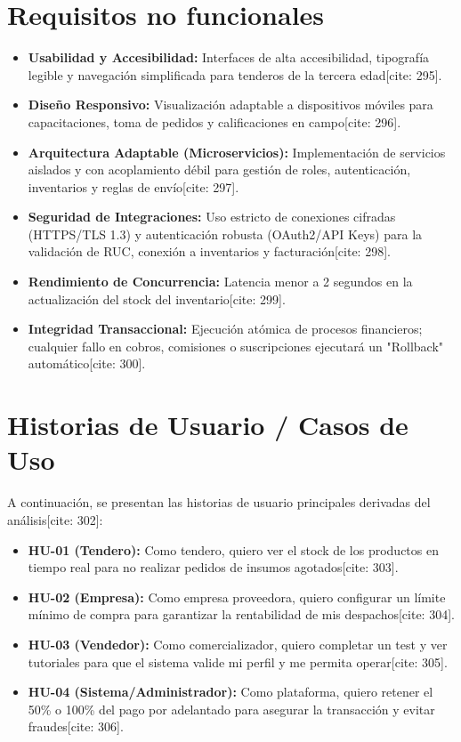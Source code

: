 \documentclass[11pt,a4paper]{report}
\begin{document}
\section{Requisitos no funcionales} %
\begin{itemize}[leftmargin=*]
    \item \textbf{Usabilidad y Accesibilidad:} Interfaces de alta accesibilidad, tipografía legible y navegación simplificada para tenderos de la tercera edad[cite: 295].
    \item \textbf{Diseño Responsivo:} Visualización adaptable a dispositivos móviles para capacitaciones, toma de pedidos y calificaciones en campo[cite: 296].
    \item \textbf{Arquitectura Adaptable (Microservicios):} Implementación de servicios aislados y con acoplamiento débil para gestión de roles, autenticación, inventarios y reglas de envío[cite: 297].
    \item \textbf{Seguridad de Integraciones:} Uso estricto de conexiones cifradas (HTTPS/TLS 1.3) y autenticación robusta (OAuth2/API Keys) para la validación de RUC, conexión a inventarios y facturación[cite: 298].
    \item \textbf{Rendimiento de Concurrencia:} Latencia menor a 2 segundos en la actualización del stock del inventario[cite: 299].
    \item \textbf{Integridad Transaccional:} Ejecución atómica de procesos financieros; cualquier fallo en cobros, comisiones o suscripciones ejecutará un "Rollback" automático[cite: 300].
\end{itemize}

\section{Historias de Usuario / Casos de Uso} %
A continuación, se presentan las historias de usuario principales derivadas del análisis[cite: 302]:
\begin{itemize}[leftmargin=*]
    \item \textbf{HU-01 (Tendero):} Como tendero, quiero ver el stock de los productos en tiempo real para no realizar pedidos de insumos agotados[cite: 303].
    \item \textbf{HU-02 (Empresa):} Como empresa proveedora, quiero configurar un límite mínimo de compra para garantizar la rentabilidad de mis despachos[cite: 304].
    \item \textbf{HU-03 (Vendedor):} Como comercializador, quiero completar un test y ver tutoriales para que el sistema valide mi perfil y me permita operar[cite: 305].
    \item \textbf{HU-04 (Sistema/Administrador):} Como plataforma, quiero retener el 50\% o 100\% del pago por adelantado para asegurar la transacción y evitar fraudes[cite: 306].
\end{itemize}
\end{document}
